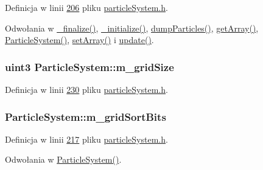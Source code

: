 Definicja w linii \hyperlink{particle_system_8h_source_l00206}{206} pliku \hyperlink{particle_system_8h_source}{particle\-System.\-h}.



Odwołania w \hyperlink{particle_system_8cpp_source_l00233}{\-\_\-finalize()}, \hyperlink{particle_system_8cpp_source_l00142}{\-\_\-initialize()}, \hyperlink{particle_system_8cpp_source_l00360}{dump\-Particles()}, \hyperlink{particle_system_8cpp_source_l00375}{get\-Array()}, \hyperlink{particle_system_8cpp_source_l00040}{Particle\-System()}, \hyperlink{particle_system_8cpp_source_l00403}{set\-Array()} i \hyperlink{particle_system_8cpp_source_l00266}{update()}.

\hypertarget{class_particle_system_ad555b31501a258d776e8c72c96178aa0}{
\subsubsection[{m\-\_\-grid\-Size}]{\setlength{\rightskip}{0pt plus 5cm}uint3 Particle\-System\-::m\-\_\-grid\-Size\hspace{0.3cm}{\ttfamily [protected]}}}\label{class_particle_system_ad555b31501a258d776e8c72c96178aa0}


Definicja w linii \hyperlink{particle_system_8h_source_l00230}{230} pliku \hyperlink{particle_system_8h_source}{particle\-System.\-h}.

\hypertarget{class_particle_system_a2a0452a32993337176d88fa2fbe63020}{
\subsubsection[{m\-\_\-grid\-Sort\-Bits}]{ Particle\-System\-::m\-\_\-grid\-Sort\-Bits\hspace{0.3cm}{\ttfamily [protected]}}}\label{class_particle_system_a2a0452a32993337176d88fa2fbe63020}


Definicja w linii \hyperlink{particle_system_8h_source_l00217}{217} pliku \hyperlink{particle_system_8h_source}{particle\-System.\-h}.



Odwołania w \hyperlink{particle_system_8cpp_source_l00040}{Particle\-System()}.


